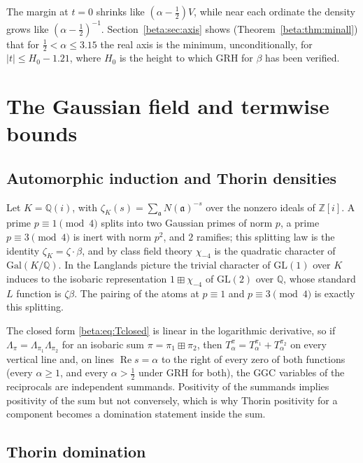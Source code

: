 \noindent The margin at $t=0$ shrinks like $(\alpha-\tfrac12)V$, while near each ordinate the density grows like $(\alpha-\tfrac12)^{-1}$. Section~\ref{beta:sec:axis} shows (Theorem~\ref{beta:thm:minall}) that for $\frac12<\alpha\le3.15$ the real axis is the minimum, unconditionally, for $|t|\le H_0-1.21$, where $H_0$ is the height to which GRH for $\beta$ has been verified.



\section{The Gaussian field and termwise bounds}\label{beta:sec:gauss}

\subsection{Automorphic induction and Thorin densities}

Let $K=\mathbb Q(i)$, with $\zeta_K(s)=\sum_{\mathfrak a}N(\mathfrak a)^{-s}$ over the nonzero ideals of $\mathbb Z[i]$. A prime $p\equiv1\pmod 4$ splits into two Gaussian primes of norm $p$, a prime $p\equiv3\pmod4$ is inert with norm $p^2$, and $2$ ramifies; this splitting law is the identity $\zeta_K=\zeta\cdot\beta$, and by class field theory $\chi_{-4}$ is the quadratic character of $\mathrm{Gal}(K/\mathbb Q)$. In the Langlands picture the trivial character of $\mathrm{GL}(1)$ over $K$ induces to the isobaric representation $1\boxplus\chi_{-4}$ of $\mathrm{GL}(2)$ over $\mathbb Q$, whose standard $L$ function is $\zeta\beta$. The pairing of the atoms at $p\equiv1$ and $p\equiv3\pmod 4$ is exactly this splitting.

\begin{remark}\label{beta:rem:isobaric}
The closed form \eqref{beta:eq:Tclosed} is linear in the logarithmic derivative, so if $\Lambda_\pi=\Lambda_{\pi_1}\Lambda_{\pi_2}$ for an isobaric sum $\pi=\pi_1\boxplus\pi_2$, then $T^\pi_\alpha=T^{\pi_1}_\alpha+T^{\pi_2}_\alpha$ on every vertical line and, on lines $\operatorname{Re}s=\alpha$ to the right of every zero of both functions (every $\alpha\ge1$, and every $\alpha>\frac12$ under GRH for both), the GGC variables of the reciprocals are independent summands. Positivity of the summands implies positivity of the sum but not conversely, which is why Thorin positivity for a component becomes a domination statement inside the sum.
\end{remark}

\subsection{Thorin domination}

